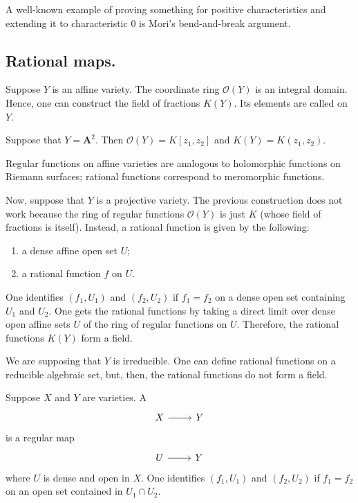 \documentclass [11 pt, oneside] {article}
\begin{document}
\begin{remark}
	A well-known example of proving something for positive characteristics and extending it to characteristic $0$ is Mori's bend-and-break argument.
\end{remark}

\subsection{Rational maps.}
Suppose $Y$ is an affine variety. The coordinate ring $\mathscr{O}(Y)$ is an integral domain. Hence, one can construct the field of fractions $K(Y)$. Its elements are called  on $Y$.

\begin{example}[ ]\label{}
Suppose that $Y=\mathbf{A}^2$. Then $\mathscr{O}(Y) = K[z_1,z_2]$ and $K(Y) =K(z_1,z_2)$. 
\end{example}

\begin{remark}
	Regular functions on affine varieties are analogous to holomorphic functions on Riemann surfaces; rational functions correspond to meromorphic functions.
\end{remark}

Now, suppose that $Y$ is a projective variety. The previous construction does not work because the ring of regular functions $\mathscr{O}(Y)$ is just $K$ (whose field of fractions is itself). Instead, a rational function is given by the following:
 \begin{enumerate}
	\item a dense affine open set $U$;
	\item a rational function $f$ on $U$.
\end{enumerate}
One identifies $(f_1,U_1)$ and $(f_2,U_2)$ if $f_1=f_2$ on a dense open set containing $U_1$ and $U_2$. One gets the rational functions by taking a direct limit over dense open affine sets $U$ of the ring of regular functions on $U$. Therefore, the rational functions $K(Y)$ form a field.

\begin{remark}
	We are supposing that $Y$ is irreducible. One can define rational functions on a reducible algebraic set, but, then, the rational functions do not form a field.
\end{remark}

Suppose $X$ and $Y$ are varieties. A  
\[
\begin{tikzcd}
X\ar[r]& Y
\end{tikzcd}
\] 
is a regular map
\[
\begin{tikzcd}
U\ar[r]& Y
\end{tikzcd}
\]
where $U$ is dense and open in $X$. One identifies $(f_1,U_1)$ and $(f_2,U_2)$ if $f_1=f_2$ on an open set contained in $U_1\cap U_2$.
\end{document}
